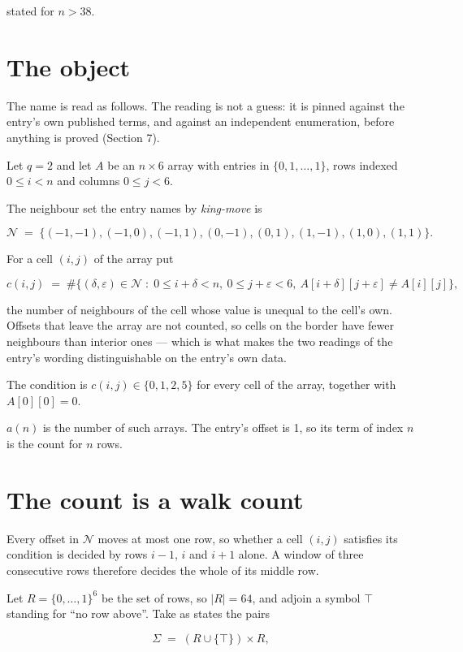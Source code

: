 \documentclass[11pt]{article}
\theoremstyle{definition}
\begin{document}
stated for $n > 38$.

\section{The object}

The name is read as follows. The reading is not a guess: it is pinned against the entry's own published terms, and against an independent enumeration, before anything is proved (Section 7).

Let $q = 2$ and let $A$ be an $n \times 6$ array with entries in $\{0,1,\dots,1\}$, rows indexed $0 \le i < n$ and columns $0 \le j < 6$.

The neighbour set the entry names by {\itshape king-move} is

\[\mathcal{N} \;=\; \{(-1,-1), (-1,0), (-1,1), (0,-1), (0,1), (1,-1), (1,0), (1,1)\}.\]

For a cell $(i,j)$ of the array put

\[c(i,j) \;=\; \#\bigl\{(\delta,\varepsilon)\in\mathcal{N} \;:\; 0\le i+\delta<n,\ 0\le j+\varepsilon<6,\ A[i+\delta][j+\varepsilon] \neq A[i][j]\bigr\},\]

the number of neighbours of the cell whose value is unequal to the cell's own. Offsets that leave the array are not counted, so cells on the border have fewer neighbours than interior ones --- which is what makes the two readings of the entry's wording distinguishable on the entry's own data.

The condition is $c(i,j) \in \{0, 1, 2, 5\}$ for every cell of the array, together with $A[0][0]=0$.

$a(n)$ is the number of such arrays. The entry's offset is 1, so its term of index $n$ is the count for $n$ rows.

\section{The count is a walk count}

Every offset in $\mathcal{N}$ moves at most one row, so whether a cell $(i,j)$ satisfies its condition is decided by rows $i-1$, $i$ and $i+1$ alone. A window of three consecutive rows therefore decides the whole of its middle row.

Let $R = \{0,\dots,1\}^{6}$ be the set of rows, so $|R| = 64$, and adjoin a symbol $\top$ standing for ``no row above''. Take as states the pairs

\[\Sigma \;=\; (R \cup \{\top\}) \times R,\]
\end{document}
